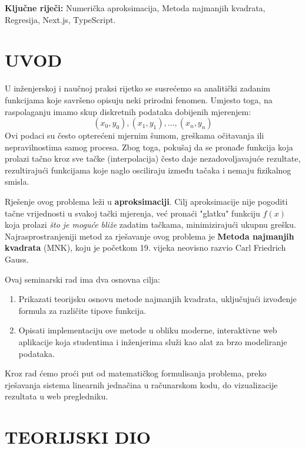 \documentclass[12pt, a4paper]{article}
\begin{document}
\textbf{Ključne riječi:} Numerička aproksimacija, Metoda najmanjih kvadrata, Regresija, Next.js, TypeScript.

\newpage
\tableofcontents
\newpage

\section{UVOD}
U inženjerskoj i naučnoj praksi rijetko se susrećemo sa analitički zadanim funkcijama koje savršeno opisuju neki prirodni fenomen. Umjesto toga, na raspolaganju imamo skup diskretnih podataka dobijenih mjerenjem:
$$ (x_0, y_0), (x_1, y_1), \dots, (x_n, y_n) $$
Ovi podaci su često opterećeni mjernim šumom, greškama očitavanja ili nepravilnostima samog procesa. Zbog toga, pokušaj da se pronađe funkcija koja prolazi tačno kroz sve tačke (interpolacija) često daje nezadovoljavajuće rezultate, rezultirajući funkcijama koje naglo osciliraju između tačaka i nemaju fizikalnog smisla.

Rješenje ovog problema leži u \textbf{aproksimaciji}. Cilj aproksimacije nije pogoditi tačne vrijednosti u svakoj tački mjerenja, već pronaći "glatku" funkciju $f(x)$ koja prolazi \textit{što je moguće bliže} zadatim tačkama, minimizirajući ukupnu grešku. Najrasprostranjeniji metod za rješavanje ovog problema je \textbf{Metoda najmanjih kvadrata} (MNK), koju je početkom 19. vijeka neovisno razvio Carl Friedrich Gauss.

Ovaj seminarski rad ima dva osnovna cilja:
\begin{enumerate}
    \item Prikazati teorijsku osnovu metode najmanjih kvadrata, uključujući izvođenje formula za različite tipove funkcija.
    \item Opisati implementaciju ove metode u obliku moderne, interaktivne web aplikacije koja studentima i inženjerima služi kao alat za brzo modeliranje podataka.
\end{enumerate}

Kroz rad ćemo proći put od matematičkog formulisanja problema, preko rješavanja sistema linearnih jednačina u računarskom kodu, do vizualizacije rezultata u web pregledniku.


\newpage

\section{TEORIJSKI DIO}
\end{document}
